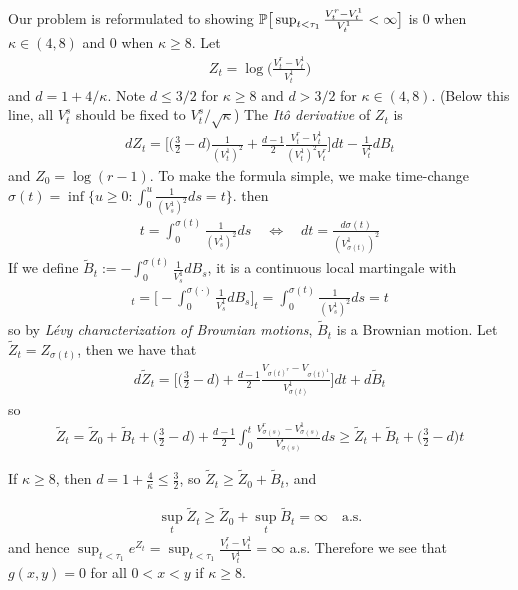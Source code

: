 \documentclass[12pt,a4paper]{article}
\begin{document}
Our problem is reformulated to showing $\mathbb{P} \big[ \sup_{t< \tau_1} \frac{V_t^r - V_t^1}{V_t^1} < \infty \big]$ is 0 when $\kappa \in (4, 8)$ and 0 when $\kappa \geq 8$. Let
\begin{align*}
Z_t = \log \big( \frac{ V_t^r - V_t^1 }{ V_t^1 } \big)
\end{align*}
and $d= 1+ 4/\kappa$. Note $d\leq 3/2$ for $\kappa \geq 8$ and $d>3/2$ for $\kappa \in (4,8)$. (Below this line, all $V_t^s$ should be fixed to $V_t^s/\sqrt{\kappa}$) The \emph{It\^o derivative} of $Z_t$ is
\begin{align*}
dZ_t = \Big[ \Big( \frac{3}{2} - d \Big)\frac{1}{(V_t^1)^2} + \frac{d-1}{2} \frac{V_t^r - V_t^1}{(V_t^1)^2 V_t^r} \Big] dt - \frac{1}{V_t^1} dB_t
\end{align*}
and $Z_0 = \log(r-1)$. To make the formula simple, we make time-change $\sigma(t) = \inf \{u\geq 0 : \int_0^u \frac{1}{(V_s^1)^2} ds = t\}$. then
\begin{align*}
t= \int_0^{\sigma(t)} \frac{1}{(V_s^1)^2} ds \quad \Leftrightarrow \quad dt= \frac{d\sigma(t)}{(V_{\sigma(t)}^1)^2}
\end{align*}
If we define $\tilde{B}_t := -\int_0^{\sigma(t)} \frac{1}{V_s^1} dB_s$, it is a continuous local martingale with
\begin{align*}
[\tilde{B}]_t = \Big[ - \int_0^{\sigma(\cdot)} \frac{1}{V_s^1}dB_s \Big]_t = \int_0^{\sigma(t)} \frac{1}{(V_s^1)^2} ds =t
\end{align*}
so by \emph{L\'evy characterization of Brownian motions}, $\tilde{B}_t$ is a Brownian motion. Let $\tilde{Z}_t = Z_{\sigma(t)}$, then we have that
\begin{align*}
d\tilde{Z}_t = \Big[ \Big(\frac{3}{2} -d \Big) + \frac{d-1}{2} \frac{V_{\sigma(t)^r} - V_{\sigma(t)^1}}{V_{\sigma(t)}^1}\Big] dt + d\tilde{B}_t 
\end{align*}
so
\begin{align*}
\tilde{Z}_t = \tilde{Z}_0 + \tilde{B}_t + \Big(\frac{3}{2} - d \Big) + \frac{d-1}{2} \int_0^t \frac{V_{\sigma(s)}^r - V_{\sigma(s)}^1}{V_{\sigma(s)}^r} ds \geq \tilde{Z}_t + \tilde{B}_t + \Big(\frac{3}{2} -d \Big)t
\end{align*}

If $\kappa \geq 8$, then $d= 1+ \frac{4}{\kappa} \leq \frac{3}{2}$, so $\tilde{Z}_t \geq \tilde{Z}_0 + \tilde{B}_t$, and

\begin{align*}
\sup_t \tilde{Z}_t \geq \tilde{Z}_0 + \sup_t \tilde{B}_t = \infty \quad \text{a.s.}
\end{align*}
and hence $\sup_{t< \tau_1} e^{Z_t} = \sup_{t< \tau_1} \frac{V_t^r - V_t^1}{V_t^1} = \infty$ a.s. Therefore we see that $g(x,y) =0$ for all $0<x<y$ if $\kappa \geq 8$.
\s
\end{document}
